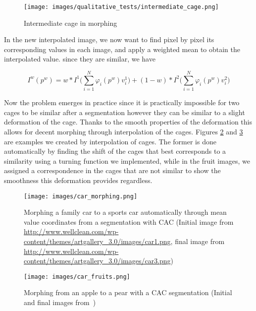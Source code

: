   \begin{figure}[h]
  	\centering
  	{\texttt{[image: images/qualitative\_tests/intermediate\_cage.png]}}
  	\caption{Intermediate cage in morphing}
  	\label{fig:intermediate_cage}
  \end{figure}
  
 
 In the new interpolated image, we now want to find pixel by pixel its corresponding values in each image, and apply a weighted mean to obtain the interpolated value. since they are similar, we have 
 
 \begin{equation}
	 I^w(p^w) = w*I^1\Bigg(\sum\limits_{i=1}^N\varphi_i(p^w)v_i^1\Bigg)+ (1-w)*I^2\Bigg(\sum\limits_{i=1}^N\varphi_i(p^w)v_i^2\Bigg)
 \end{equation}
 
 Now the problem emerges in practice since it is practically impossible for two cages to be similar after a segmentation however they can be similar to a slight deformation of the cage. Thanks to the smooth properties of the deformation this allows for decent morphing through interpolation of the cages. Figures \ref{fig:car_morphing}  and \ref{fig:car_fruits} are examples we created by interpolation of cages. The former is done automatically by finding the shift of the cages that best corresponds to a similarity using a turning function we implemented, while in the fruit images, we assigned a correspondence in the cages that are not similar to show the smoothness this deformation provides regardless.

  \begin{figure}[h!]
  	\centering
  	{\texttt{[image: images/car\_morphing.png]}}
  	\caption{Morphing a family car to a sports car automatically through mean value coordinates from a segmentation with CAC  (Initial image from \url{http://www.wellclean.com/wp-content/themes/artgallery_3.0/images/car1.png}, final image from \url{http://www.wellclean.com/wp-content/themes/artgallery_3.0/images/car3.png})}
  	\label{fig:car_morphing}
  \end{figure}
  
  
  \begin{figure}[h!]
  	\centering
  	{\texttt{[image: images/car\_fruits.png]}}
  	\caption{Morphing from an apple to a pear with a CAC segmentation (Initial and final images from~\cite{Marko2013a})}
  	\label{fig:car_fruits}
  \end{figure}
  
%


